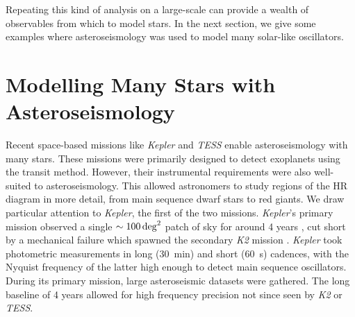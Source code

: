 

Repeating this kind of analysis on a large-scale can provide a wealth of observables from which to model stars. In the next section, we give some examples where asteroseismology was used to model many solar-like oscillators.

\section[Modelling Stars with Asteroseismology]{Modelling Many Stars with Asteroseismology}\label{sec:many-stars}

Recent space-based missions like \emph{Kepler} and \emph{TESS} enable asteroseismology with many stars. These missions were primarily designed to detect exoplanets using the transit method. However, their instrumental requirements were also well-suited to asteroseismology. This allowed astronomers to study regions of the HR diagram in more detail, from main sequence dwarf stars to red giants. We draw particular attention to \emph{Kepler}, the first of the two missions. \emph{Kepler}'s primary mission observed a single \(\sim\SI{100}{deg\squared}\) patch of sky for around 4 years \citep{Borucki.Koch.ea2010}, cut short by a mechanical failure which spawned the secondary \emph{K2} mission \citep{Howell.Sobeck.ea2014}. \emph{Kepler} took photometric measurements in long (\SI{30}{\minute}) and short (\SI{60}{\second}) cadences, with the Nyquist frequency of the latter high enough to detect main sequence oscillators. During its primary mission, large asteroseismic datasets were gathered. The long baseline of 4 years allowed for high frequency precision not since seen by \emph{K2} or \emph{TESS}.

